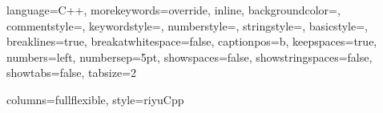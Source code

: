 
\usepackage{listings}
\usepackage{xcolor}



{
language=C++,
morekeywords={override, inline}, %
backgroundcolor=\color{backcolour},   
commentstyle=\color{codegreen},
keywordstyle=\color{indigo-keywords},
numberstyle=\tiny\color{codegray},
stringstyle=\color{codepurple},
basicstyle=\footnotesize\linespread{0.5},     
breaklines=true,
breakatwhitespace=false, %
captionpos=b,                    
keepspaces=true,                 
numbers=left,                    
numbersep=5pt,                  
showspaces=false,                
showstringspaces=false,
showtabs=false,          
tabsize=2
}

\lstset
{
columns=fullflexible,
style=riyuCpp
}